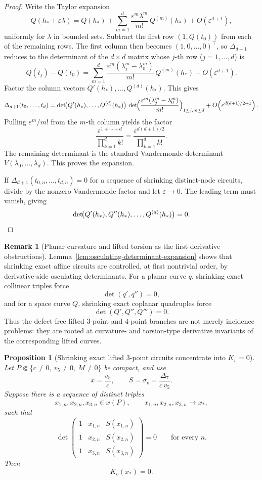 \documentclass[11pt,a4paper]{amsart}
\theoremstyle{plain}
\newtheorem{proposition}[theorem]{Proposition}
\theoremstyle{definition}
\newtheorem{remark}[theorem]{Remark}
\begin{document}
\begin{proof}
Write the Taylor expansion
\[
Q(h_*+\varepsilon\lambda)
=
Q(h_*)+\sum_{m=1}^d \frac{\varepsilon^m\lambda^m}{m!}\,Q^{(m)}(h_*)
+O(\varepsilon^{d+1}),
\]
uniformly for $\lambda$ in bounded sets. Subtract the first row
$(1,Q(t_0))$ from each of the remaining rows. The first column then becomes
$(1,0,\dots,0)^{\top}$, so $\Delta_{d+1}$ reduces to the determinant of the
$d\times d$ matrix whose $j$-th row ($j=1,\dots,d$) is
\[
Q(t_j)-Q(t_0)
=
\sum_{m=1}^d \frac{\varepsilon^m(\lambda_j^m-\lambda_0^m)}{m!}\,Q^{(m)}(h_*)
+O(\varepsilon^{d+1}).
\]
Factor the column vectors $Q'(h_*),\dots,Q^{(d)}(h_*)$. This gives
\[
\Delta_{d+1}(t_0,\dots,t_d)
=
\det\!\bigl(Q'(h_*),\dots,Q^{(d)}(h_*)\bigr)\,
\det\!\Bigl(\frac{\varepsilon^m(\lambda_j^m-\lambda_0^m)}{m!}\Bigr)_{1\le j,m\le d}
+O\!\left(\varepsilon^{d(d+1)/2+1}\right).
\]
Pulling $\varepsilon^m/m!$ from the $m$-th column yields the factor
\[
\frac{\varepsilon^{1+\cdots+d}}{\prod_{k=1}^d k!}
=
\frac{\varepsilon^{d(d+1)/2}}{\prod_{k=1}^d k!}.
\]
The remaining determinant is the standard Vandermonde determinant
$V(\lambda_0,\dots,\lambda_d)$. This proves the expansion.

If $\Delta_{d+1}(t_{0,n},\dots,t_{d,n})=0$ for a sequence of shrinking
distinct-node circuits, divide by the nonzero Vandermonde factor and let
$\varepsilon\to 0$. The leading term must vanish, giving
\[
\det\!\bigl(Q'(h_*),Q''(h_*),\dots,Q^{(d)}(h_*)\bigr)=0.
\qedhere
\]
\end{proof}

\begin{remark}[Planar curvature and lifted torsion as the first derivative obstructions]
\label{rem:derivative-geometry-curvature-torsion-bridge}
Lemma~\ref{lem:osculating-determinant-expansion} shows that shrinking exact
affine circuits are controlled, at first nontrivial order, by derivative-side
osculating determinants. For a planar curve $q$, shrinking exact collinear
triples force
\[
\det(q',q'')=0,
\]
and for a space curve $Q$, shrinking exact coplanar quadruples force
\[
\det(Q',Q'',Q''')=0.
\]
Thus the defect-free lifted $3$-point and $4$-point branches are not merely
incidence problems: they are rooted at curvature- and torsion-type derivative
invariants of the corresponding lifted curves.
\end{remark}

\begin{proposition}[Shrinking exact lifted $3$-point circuits concentrate into $K_v=0$]
\label{prop:shrinking-exact-lifted-three-point-circuits-force-Kv-zero}
Let $P\Subset\{c\neq 0,\ v_5\neq 0,\ M\neq 0\}$ be compact, and use
\[
x=\frac{v_5}{c},
\qquad
S=\sigma_v=\frac{\Delta_7}{c\,v_5}.
\]
Suppose there is a sequence of distinct triples
\[
x_{1,n},x_{2,n},x_{3,n}\in x(P),
\qquad
x_{1,n},x_{2,n},x_{3,n}\to x_*,
\]
such that
\[
\det\!\begin{pmatrix}
1&x_{1,n}&S(x_{1,n})\\
1&x_{2,n}&S(x_{2,n})\\
1&x_{3,n}&S(x_{3,n})
\end{pmatrix}
=0
\qquad
\text{for every }n.
\]
Then
\[
K_v(x_*)=0.
\]
\end{proposition}
\end{document}
